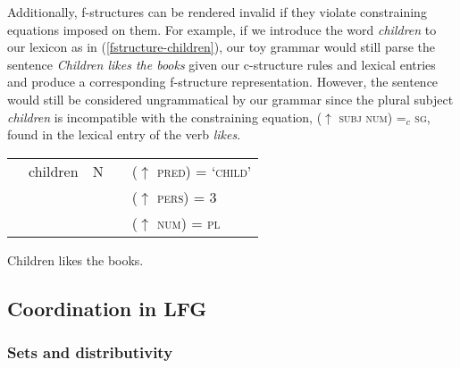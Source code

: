 Additionally, f-structures can be rendered invalid if they violate constraining equations imposed on them. For example, if we introduce the word \textit{children} to our lexicon as in (\ref{fstructure-children}), our toy grammar would still parse the sentence \textit{Children likes the books} given our c-structure rules and lexical entries and produce a corresponding f-structure representation. However, the sentence would still be considered ungrammatical by our grammar since the plural subject \textit{children} is incompatible with the constraining equation, ($\uparrow$ \textsc{subj} \textsc{num}) =$_c$ \textsc{sg}, found in the lexical entry of the verb \textit{likes}.

\pex
\vspace{-13pt}

\label{fstructure-children}
\begin{tabular}{lllll}
	&	children & N & & ($\uparrow$ \textsc{pred}) = `\textsc{child}' \\
	&& &  & ($\uparrow$ \textsc{pers}) = 3 \\
	&&&&($\uparrow$ \textsc{num}) = \textsc{pl}\\
	
\end{tabular}
\xe

\pex
Children likes the books.
\vspace{7pt}

\label{lexicalentry-children}
\xe


\subsection{Coordination in LFG}

\subsubsection{Sets and distributivity}

